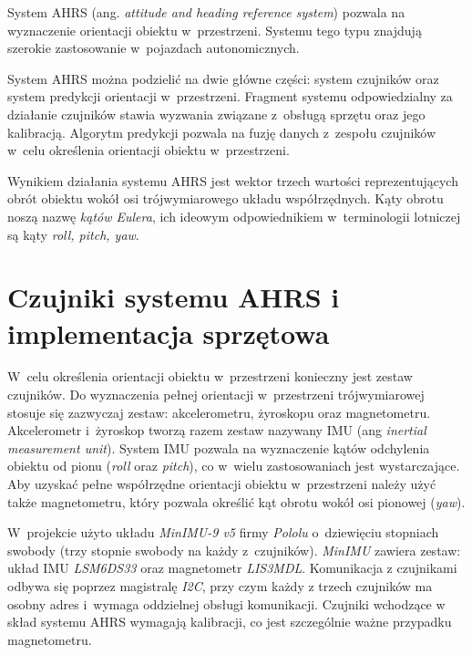System AHRS (ang. \textit{attitude and heading reference system}) pozwala na
wyznaczenie orientacji obiektu w~przestrzeni.
Systemu tego typu znajdują szerokie zastosowanie w~pojazdach autonomicznych.

System AHRS można podzielić na dwie główne części: system czujników oraz system
predykcji orientacji w~przestrzeni.
Fragment systemu odpowiedzialny za działanie czujników stawia wyzwania związane
z~obsługą sprzętu oraz jego kalibracją.
Algorytm predykcji pozwala na fuzję danych z~zespołu czujników w~celu
określenia orientacji obiektu w~przestrzeni.

Wynikiem działania systemu AHRS jest wektor trzech wartości reprezentujących
obrót obiektu wokół osi trójwymiarowego układu współrzędnych.
Kąty obrotu noszą nazwę \textit{kątów Eulera}, ich ideowym odpowiednikiem
w~terminologii lotniczej są kąty \textit{roll, pitch, yaw}.

\section{Czujniki systemu AHRS i implementacja sprzętowa}
W~celu określenia orientacji obiektu w~przestrzeni konieczny jest zestaw
czujników.
Do wyznaczenia pełnej orientacji w~przestrzeni trójwymiarowej stosuje się
zazwyczaj zestaw: akcelerometru, żyroskopu oraz magnetometru.
Akcelerometr i~żyroskop tworzą razem zestaw nazywany IMU (ang \textit{inertial
measurement unit}).
System IMU pozwala na wyznaczenie kątów odchylenia obiektu od pionu
(\textit{roll} oraz \textit{pitch}), co w~wielu zastosowaniach jest
wystarczające.
Aby uzyskać pełne współrzędne orientacji obiektu w~przestrzeni należy użyć
także magnetometru, który pozwala określić kąt obrotu wokół osi pionowej
(\textit{yaw}).

W~projekcie użyto układu \textit{MinIMU-9 v5} firmy \textit{Pololu}
o~dziewięciu stopniach swobody (trzy stopnie swobody na każdy z~czujników).
\textit{MinIMU} zawiera zestaw: układ IMU \textit{LSM6DS33} oraz magnetometr
\textit{LIS3MDL}.
Komunikacja z czujnikami odbywa się poprzez magistralę \textit{I2C}, przy czym
każdy z trzech czujników ma osobny adres i~wymaga oddzielnej obsługi
komunikacji.
Czujniki wchodzące w skład systemu AHRS wymagają kalibracji, co jest
szczególnie ważne przypadku magnetometru.


